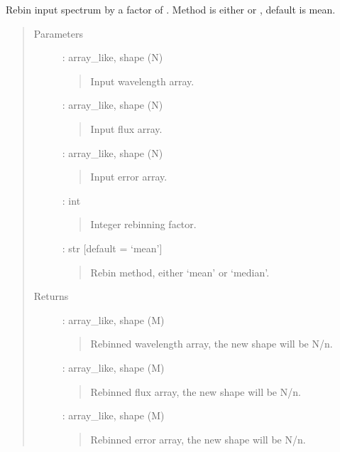 \documentclass[letterpaper,10pt,english]{sphinxmanual}
\begin{document}
\begin{fulllineitems}
\label{\detokenize{api:output.rebin_spectrum}}
Rebin input spectrum by a factor of .
Method is either  or , default is mean.
\begin{quote}\begin{description}
\item[{Parameters}] \leavevmode
{} : array\_like, shape (N)
\begin{quote}

Input wavelength array.
\end{quote}

 : array\_like, shape (N)
\begin{quote}

Input flux array.
\end{quote}

 : array\_like, shape (N)
\begin{quote}

Input error array.
\end{quote}

 : int
\begin{quote}

Integer rebinning factor.
\end{quote}

 : str   {[}default = ‘mean’{]}
\begin{quote}

Rebin method, either ‘mean’ or ‘median’.
\end{quote}

\item[{Returns}] \leavevmode
{} : array\_like, shape (M)
\begin{quote}

Rebinned wavelength array, the new shape will be N/n.
\end{quote}

 : array\_like, shape (M)
\begin{quote}

Rebinned flux array, the new shape will be N/n.
\end{quote}

 : array\_like, shape (M)
\begin{quote}

Rebinned error array, the new shape will be N/n.
\end{quote}

\end{description}\end{quote}

\end{fulllineitems}
\end{document}
